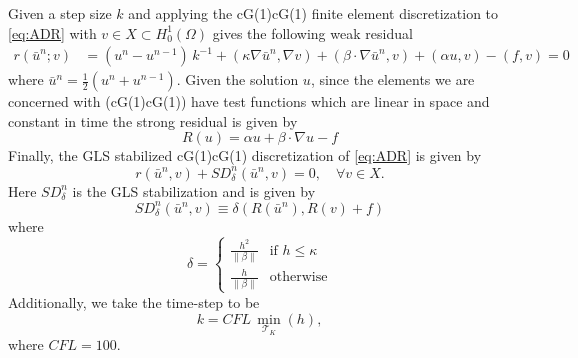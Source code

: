     Given a step size $k$ and applying the cG(1)cG(1) finite element
    discretization to \eqref{eq:ADR} with $v \in X \subset H^1_0(\Omega)$ gives
    the following weak residual
    \begin{equation}
    \begin{split}
        r(\bar{u}^n; v) &= \left(u^n - u^{n-1}\right)\,k^{-1}
            + (\kappa \nabla \bar{u}^n, \nabla v)
            + (\beta \cdot \nabla \bar{u}^n, v) + (\alpha u, v) - (f, v) = 0
    \end{split}
    \label{eqn:WeakADR}
    \end{equation}
    where $\bar{u}^n = \frac{1}{2}\left(u^n + u^{n-1}\right)$. Given the
    solution $u$, since the elements we are concerned with (cG(1)cG(1)) have
    test functions which are linear in space and constant in time the strong
    residual is given by
    \begin{equation}
        R(u) = \alpha u + \beta \cdot \nabla u - f
    \label{eqn:StrongADR}
    \end{equation}
    Finally, the GLS stabilized cG(1)cG(1) discretization of \eqref{eq:ADR} is
    given by
    \begin{equation}
        r(\bar{u}^n,v) + SD_{\delta}^n(\bar{u}^n,v) = 0,
            \quad \forall v \in X.
        \label{eqn:G2ADR}
    \end{equation}
    Here $SD_{\delta}^n$ is the GLS stabilization and is given by
    \begin{equation}
        SD_{\delta}^n(\bar{u}^n, v) \equiv \delta \left(R(\bar{u}^n), R(v)
            + f\right)
    \label{eq:ADRStabilization}
    \end{equation}
    where
    \begin{equation}
        \delta = \begin{cases}
            \frac{h^2}{\|\beta\|} & \text{if } h \le \kappa \\
            \frac{h}{\|\beta\|} & \text{otherwise}
        \end{cases}
        \label{eq:ADRdelta}
    \end{equation}
    Additionally, we take the time-step to be
    \begin{equation*}
        k = CFL\, \min_{\mathcal{T}_K}(h),
    \end{equation*}
    where $CFL=100$.


